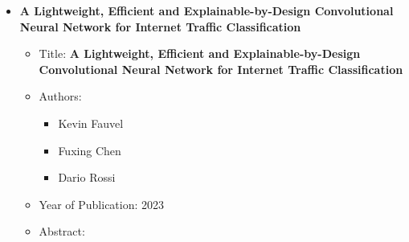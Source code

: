 \documentclass{article}
\begin{document}
\begin{itemize}
\begin{itemize}
\begin{abstract}
            \end{abstract}
        
        \end{itemize}

        \item \textbf{A Lightweight, Efficient and Explainable-by-Design
        Convolutional Neural Network for Internet Traffic Classification}
        
        \begin{itemize}
        
            \item Title: \textbf{A Lightweight, Efficient and Explainable-by-Design
            Convolutional Neural Network for Internet Traffic Classification}
        
            \item Authors:
        
            \begin{itemize}
        
                \item Kevin Fauvel
        
                \item Fuxing Chen
        
                \item Dario Rossi
        
            \end{itemize}
        
            \item Year of Publication: 2023
        
            \item Abstract:
        
            \begin{abstract}
        

\end{abstract}
\end{itemize}
\end{itemize}
\end{document}
